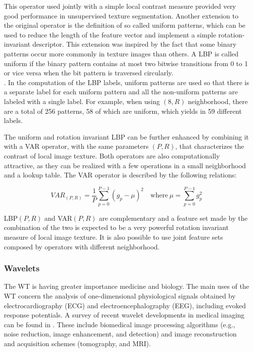 This operator used jointly with a simple local contrast measure provided very good performance in unsupervised texture segmentation.
Another extension to the original operator is the definition of so called uniform patterns, which can be used to reduce the length of the feature
vector and implement a simple rotation-invariant descriptor. This extension was inspired by the fact that some binary patterns occur more commonly
in texture images than others. A \Gls{LBP} is called uniform if the binary pattern contains at most two bitwise transitions from 0 to 1
or vice versa when the bit pattern is traversed circularly.\\
. In the computation of the \Gls{LBP} labels, uniform patterns are used so that there is a separate label for each uniform pattern and all
the non-uniform patterns are labeled with a single label.
For example, when using $(8,R)$ neighborhood, there are a total of 256 patterns, 58 of which are uniform, which yields in 59 different labels. 

The uniform and rotation invariant \Gls{LBP}  can be further enhanced by combining it with a \Gls{VAR} operator, with the same parameters $(P,R)$,
that characterizes the contrast of local image texture\cite{LBP02}.
Both operators are also computationally attractive, as they can be realized with a few operations in a small neighborhood and a lookup table.
The \Gls{VAR} operator is described by the following relations:

\begin{equation}
\label{ch2:eq_lbp2}
 VAR_{(P,R)} = \frac{1}{P} \sum_{p=0}^{P-1}(g_p - \mu)^{2} \quad \textrm{where} \ \mu = \sum_{p=0}^{P-1}g_p^2
\end{equation}

\Gls{LBP}$(P,R)$ and \Gls{VAR}$(P,R)$ are complementary and a feature set made by the combination of the two is expected to be a very
powerful rotation invariant measure of local image texture. It is also possible to use joint feature sets composed by operators with different neighborhood.

\subsubsection{Wavelets}

The \Gls{WT} is having greater importance medicine and biology.
The main uses of the \Gls{WT} concern the analysis of one-dimensional physiological signals obtained by electrocardiography (ECG)
and electroencephalography (EEG), including evoked response potentials\cite{wavelets}.
A survey of recent wavelet developments in medical imaging can be found in \cite{waveletsBiomed}.
These include biomedical image processing algorithms (e.g., noise reduction, image enhancement, and detection) and
image reconstruction and acquisition schemes (tomography, and \Gls{MRI}).


